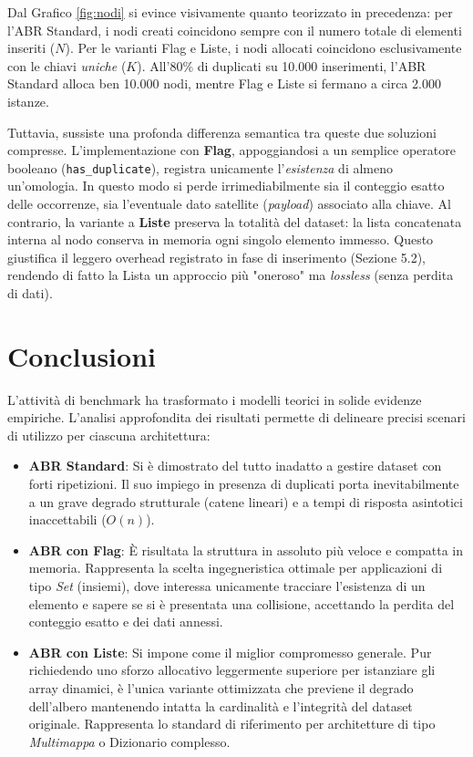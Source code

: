 \documentclass[11pt,a4paper]{article}
\begin{document}
Dal Grafico \ref{fig:nodi} si evince visivamente quanto teorizzato in precedenza: per l'ABR Standard, i nodi creati coincidono sempre con il numero totale di elementi inseriti ($N$). Per le varianti Flag e Liste, i nodi allocati coincidono esclusivamente con le chiavi \textit{uniche} ($K$). All'80\% di duplicati su 10.000 inserimenti, l'ABR Standard alloca ben 10.000 nodi, mentre Flag e Liste si fermano a circa 2.000 istanze.

Tuttavia, sussiste una profonda differenza semantica tra queste due soluzioni compresse. L'implementazione con \textbf{Flag}, appoggiandosi a un semplice operatore booleano (\texttt{has\_duplicate}), registra unicamente l'\textit{esistenza} di almeno un'omologia. In questo modo si perde irrimediabilmente sia il conteggio esatto delle occorrenze, sia l'eventuale dato satellite (\textit{payload}) associato alla chiave. 
Al contrario, la variante a \textbf{Liste} preserva la totalità del dataset: la lista concatenata interna al nodo conserva in memoria ogni singolo elemento immesso. Questo giustifica il leggero overhead registrato in fase di inserimento (Sezione 5.2), rendendo di fatto la Lista un approccio più "oneroso" ma \textit{lossless} (senza perdita di dati).

\section{Conclusioni}

L'attività di benchmark ha trasformato i modelli teorici in solide evidenze empiriche. L'analisi approfondita dei risultati permette di delineare precisi scenari di utilizzo per ciascuna architettura:
\begin{itemize}
    \item \textbf{ABR Standard}: Si è dimostrato del tutto inadatto a gestire dataset con forti ripetizioni. Il suo impiego in presenza di duplicati porta inevitabilmente a un grave degrado strutturale (catene lineari) e a tempi di risposta asintotici inaccettabili ($O(n)$).
    \item \textbf{ABR con Flag}: È risultata la struttura in assoluto più veloce e compatta in memoria. Rappresenta la scelta ingegneristica ottimale per applicazioni di tipo \textit{Set} (insiemi), dove interessa unicamente tracciare l'esistenza di un elemento e sapere se si è presentata una collisione, accettando la perdita del conteggio esatto e dei dati annessi.
    \item \textbf{ABR con Liste}: Si impone come il miglior compromesso generale. Pur richiedendo uno sforzo allocativo leggermente superiore per istanziare gli array dinamici, è l'unica variante ottimizzata che previene il degrado dell'albero mantenendo intatta la cardinalità e l'integrità del dataset originale. Rappresenta lo standard di riferimento per architetture di tipo \textit{Multimappa} o Dizionario complesso.
\end{itemize}
\end{document}

